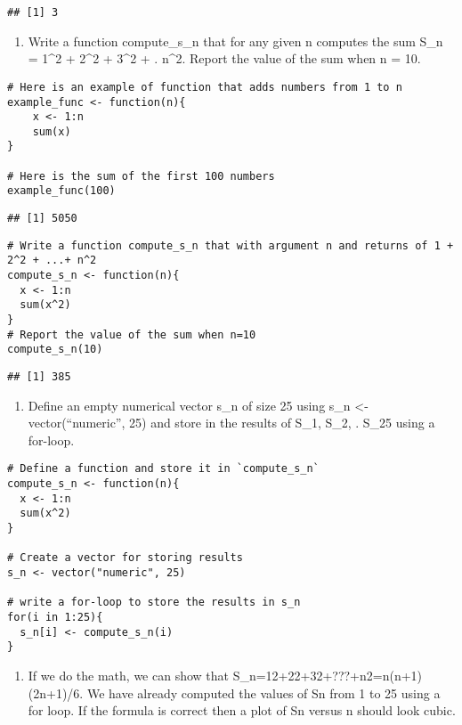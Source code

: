 \documentclass[]{article}
\providecommand{\tightlist}{%
  \setlength{\itemsep}{0pt}\setlength{\parskip}{0pt}}
\begin{document}
\begin{verbatim}
## [1] 3
\end{verbatim}

\begin{enumerate}
\def\labelenumi{\arabic{enumi}.}
\setcounter{enumi}{6}
\tightlist
\item
  Write a function compute\_s\_n that for any given n computes the sum
  S\_n = 1\^{}2 + 2\^{}2 + 3\^{}2 + . n\^{}2. Report the value of the
  sum when n = 10.
\end{enumerate}

\begin{verbatim}
# Here is an example of function that adds numbers from 1 to n
example_func <- function(n){
    x <- 1:n
    sum(x)
}

# Here is the sum of the first 100 numbers
example_func(100)
\end{verbatim}

\begin{verbatim}
## [1] 5050
\end{verbatim}

\begin{verbatim}
# Write a function compute_s_n that with argument n and returns of 1 + 2^2 + ...+ n^2
compute_s_n <- function(n){
  x <- 1:n
  sum(x^2)
}
# Report the value of the sum when n=10
compute_s_n(10)
\end{verbatim}

\begin{verbatim}
## [1] 385
\end{verbatim}

\begin{enumerate}
\def\labelenumi{\arabic{enumi}.}
\setcounter{enumi}{7}
\tightlist
\item
  Define an empty numerical vector s\_n of size 25 using s\_n
  \textless{}- vector(``numeric'', 25) and store in the results of S\_1,
  S\_2, . S\_25 using a for-loop.
\end{enumerate}

\begin{verbatim}
# Define a function and store it in `compute_s_n`
compute_s_n <- function(n){
  x <- 1:n
  sum(x^2)
}

# Create a vector for storing results
s_n <- vector("numeric", 25)

# write a for-loop to store the results in s_n
for(i in 1:25){
  s_n[i] <- compute_s_n(i)
}
\end{verbatim}

\begin{enumerate}
\def\labelenumi{\arabic{enumi}.}
\setcounter{enumi}{8}
\tightlist
\item
  If we do the math, we can show that
  S\_n=12+22+32+???+n2=n(n+1)(2n+1)/6. We have already computed the
  values of Sn from 1 to 25 using a for loop. If the formula is correct
  then a plot of Sn versus n should look cubic.
\end{enumerate}
\end{document}
